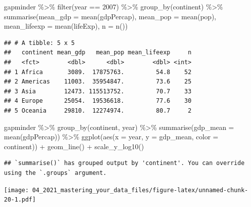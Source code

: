 \documentclass[
]{article}
\newenvironment{Shaded}{\begin{snugshade}}{\end{snugshade}}
\newcommand{\AttributeTok}[1]{\textcolor[rgb]{0.77,0.63,0.00}{#1}}
\newcommand{\DecValTok}[1]{\textcolor[rgb]{0.00,0.00,0.81}{#1}}
\newcommand{\FunctionTok}[1]{\textcolor[rgb]{0.00,0.00,0.00}{#1}}
\newcommand{\NormalTok}[1]{#1}
\newcommand{\SpecialCharTok}[1]{\textcolor[rgb]{0.00,0.00,0.00}{#1}}
\begin{document}
\begin{Shaded}
\begin{Highlighting}[]
\NormalTok{gapminder }\SpecialCharTok{\%\textgreater{}\%} 
  \FunctionTok{filter}\NormalTok{(year }\SpecialCharTok{==} \DecValTok{2007}\NormalTok{) }\SpecialCharTok{\%\textgreater{}\%} 
  \FunctionTok{group\_by}\NormalTok{(continent) }\SpecialCharTok{\%\textgreater{}\%} 
  \FunctionTok{summarise}\NormalTok{(}\AttributeTok{mean\_gdp =} \FunctionTok{mean}\NormalTok{(gdpPercap), }
            \AttributeTok{mean\_pop =} \FunctionTok{mean}\NormalTok{(pop), }
            \AttributeTok{mean\_lifeexp =} \FunctionTok{mean}\NormalTok{(lifeExp), }
            \AttributeTok{n =} \FunctionTok{n}\NormalTok{())}
\end{Highlighting}
\end{Shaded}

\begin{verbatim}
## # A tibble: 5 x 5
##   continent mean_gdp   mean_pop mean_lifeexp     n
##   <fct>        <dbl>      <dbl>        <dbl> <int>
## 1 Africa       3089.  17875763.         54.8    52
## 2 Americas    11003.  35954847.         73.6    25
## 3 Asia        12473. 115513752.         70.7    33
## 4 Europe      25054.  19536618.         77.6    30
## 5 Oceania     29810.  12274974.         80.7     2
\end{verbatim}

\begin{Shaded}
\begin{Highlighting}[]
\NormalTok{gapminder }\SpecialCharTok{\%\textgreater{}\%} 
  \FunctionTok{group\_by}\NormalTok{(continent, year) }\SpecialCharTok{\%\textgreater{}\%} 
  \FunctionTok{summarise}\NormalTok{(}\AttributeTok{gdp\_mean =} \FunctionTok{mean}\NormalTok{(gdpPercap)) }\SpecialCharTok{\%\textgreater{}\%} 
  \FunctionTok{ggplot}\NormalTok{(}\FunctionTok{aes}\NormalTok{(}\AttributeTok{x =}\NormalTok{ year, }
             \AttributeTok{y =}\NormalTok{ gdp\_mean, }
             \AttributeTok{color =}\NormalTok{ continent)) }\SpecialCharTok{+} 
  \FunctionTok{geom\_line}\NormalTok{() }\SpecialCharTok{+} 
  \FunctionTok{scale\_y\_log10}\NormalTok{()}
\end{Highlighting}
\end{Shaded}

\begin{verbatim}
## `summarise()` has grouped output by 'continent'. You can override using the `.groups` argument.
\end{verbatim}

\texttt{[image: 04\_2021\_mastering\_your\_data\_files/figure-latex/unnamed-chunk-20-1.pdf]}
\end{document}
